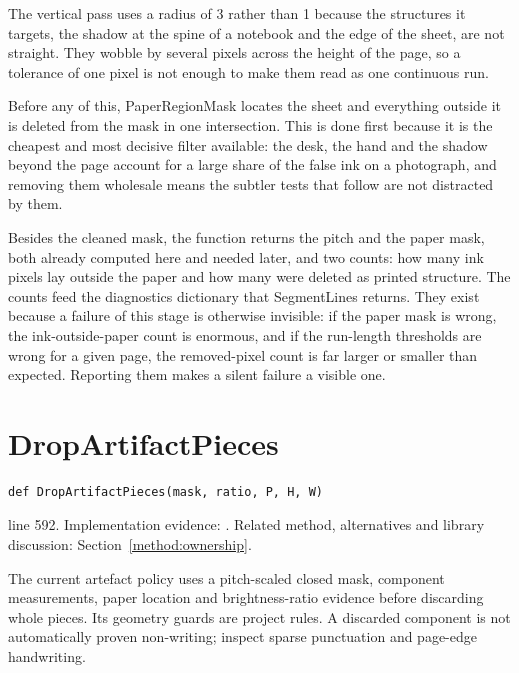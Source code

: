 The vertical pass uses a radius of 3 rather than 1 because the structures it targets, the shadow at the spine of a notebook and the edge of the sheet, are not straight. They wobble by several pixels across the height of the page, so a tolerance of one pixel is not enough to make them read as one continuous run.


Before any of this, PaperRegionMask locates the sheet and everything outside it is deleted from the mask in one intersection. This is done first because it is the cheapest and most decisive filter available: the desk, the hand and the shadow beyond the page account for a large share of the false ink on a photograph, and removing them wholesale means the subtler tests that follow are not distracted by them.


Besides the cleaned mask, the function returns the pitch and the paper mask, both already computed here and needed later, and two counts: how many ink pixels lay outside the paper and how many were deleted as printed structure. The counts feed the diagnostics dictionary that SegmentLines returns. They exist because a failure of this stage is otherwise invisible: if the paper mask is wrong, the ink-outside-paper count is enormous, and if the run-length thresholds are wrong for a given page, the removed-pixel count is far larger or smaller than expected. Reporting them makes a silent failure a visible one.



\section{DropArtifactPieces}\label{fn:segment:DropArtifactPieces}
\begin{lstlisting}[style=sig]
def DropArtifactPieces(mask, ratio, P, H, W)
\end{lstlisting}
 line 592. Implementation evidence: \cite{code2026}. Related method, alternatives and library discussion: Section~\ref{method:ownership}.


The current artefact policy uses a pitch-scaled closed mask, component measurements, paper location and brightness-ratio evidence before discarding whole pieces. Its geometry guards are project rules. A discarded component is not automatically proven non-writing; inspect sparse punctuation and page-edge handwriting.


